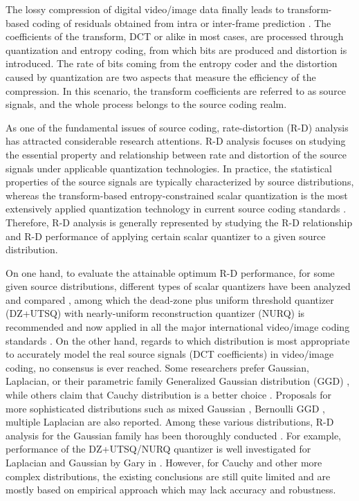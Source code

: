 \documentclass[smallabstract,smallcaptions]{dccpaper}
\begin{document}
\let\thefootnote\relax{}

The lossy compression of digital video/image data finally leads to transform-based coding of residuals obtained from intra or inter-frame prediction \cite{Sullivan_IEEE2005}. The coefficients of the transform, DCT or alike in most cases, are processed through quantization and entropy coding, from which bits are produced and distortion is introduced. The rate of bits coming from the entropy coder and the distortion caused by quantization are two aspects that measure the efficiency of the compression. In this scenario, the transform coefficients are referred to as source signals, and the whole process belongs to the source coding realm.

As one of the fundamental issues of source coding, rate-distortion (R-D) analysis has attracted considerable research attentions. R-D analysis focuses on studying the essential property and relationship between rate and distortion of the source signals under applicable quantization technologies. In practice, the statistical properties of the source signals are typically characterized by source distributions, whereas the transform-based entropy-constrained scalar quantization is the most extensively applied quantization technology in current source coding standards \cite{Hang_TCSVT1997}. Therefore, R-D analysis is generally represented by studying the R-D relationship and R-D performance of applying certain scalar quantizer to a given source distribution.

On one hand, to evaluate the attainable optimum R-D performance, for some given source distributions, different types of scalar quantizers have been analyzed and compared \cite{Sullivan_TIT1996}, among which the dead-zone plus uniform threshold quantizer (DZ+UTSQ) with nearly-uniform reconstruction quantizer (NURQ) is recommended and now applied in all the major international video/image coding standards \cite{Sullivan_VCIP2005}. On the other hand, regards to which distribution is most appropriate to accurately model the real source signals (DCT coefficients) in video/image coding, no consensus is ever reached. Some researchers prefer Gaussian, Laplacian, or their parametric family Generalized Gaussian distribution (GGD) \cite{Pratt_Wiley1978,Smooth_SPIE1996,Sun_TCSVT2009}, while others claim that Cauchy distribution is a better choice \cite{Kamaci_TCSVT2005} \cite{Rod_TCSVT2010}. Proposals for more sophisticated distributions such as mixed Gaussian \cite{Eude_ICASSP1994}, Bernoulli GGD \cite{Fraysse_TIT2009}, multiple Laplacian \cite{Lee_TCSVT2014} are also reported. Among these various distributions, R-D analysis for the Gaussian family has been thoroughly conducted \cite{Sun_TIP2013}. For example, performance of the DZ+UTSQ/NURQ quantizer is well investigated for Laplacian and Gaussian by Gary in \cite{Sullivan_VCIP2005}. However, for Cauchy and other more complex distributions, the existing conclusions are still quite limited and are mostly based on empirical approach which may lack accuracy and robustness.
\end{document}
